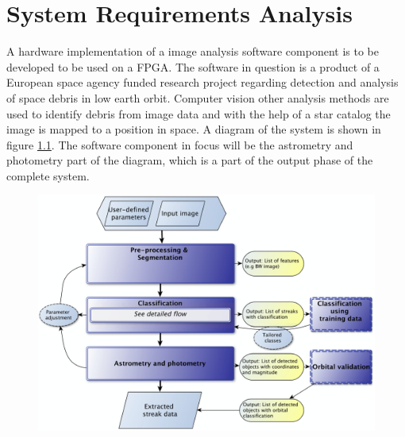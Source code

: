 \documentclass[12pt]{report}
\begin{document}

\chapter{System Requirements Analysis}

A hardware implementation of a image analysis software component is to be developed to be used on a FPGA. The software in question is a product of a European space agency funded research project regarding detection and analysis of space debris in low earth orbit. Computer vision other analysis methods are used to identify debris from image data and with the help of a star catalog the image is mapped to a position in space. A diagram of the system is shown in figure \ref{fig:0}. The software component in focus will be the astrometry and photometry part of the diagram, which is a part of the output phase of the complete system. 

\citep{StreakDet}

\begin{figure}[h]
    \centering
    \includegraphics[scale=0.2]{figures/streakdet.png}
    \caption{\citep{StreakDet}}
    \label{fig:0}
\end{figure}
\end{document}
